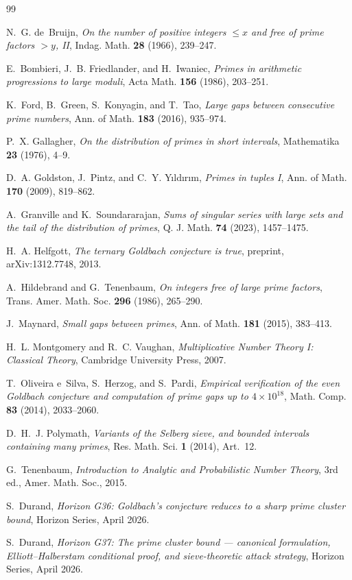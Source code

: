 \documentclass[11pt,reqno]{amsart}
\theoremstyle{plain}
\theoremstyle{definition}
\theoremstyle{remark}
\begin{document}
\begin{thebibliography}{99}

N.~G. de~Bruijn,
\emph{On the number of positive integers $\le x$ and free of prime
factors $> y$, II},
Indag. Math. \textbf{28} (1966), 239--247.

E.~Bombieri, J.~B. Friedlander, and H.~Iwaniec,
\emph{Primes in arithmetic progressions to large moduli},
Acta Math. \textbf{156} (1986), 203--251.

K.~Ford, B.~Green, S.~Konyagin, and T.~Tao,
\emph{Large gaps between consecutive prime numbers},
Ann. of Math. \textbf{183} (2016), 935--974.

P.~X. Gallagher,
\emph{On the distribution of primes in short intervals},
Mathematika \textbf{23} (1976), 4--9.

D.~A. Goldston, J.~Pintz, and C.~Y. Y{\i}ld{\i}r{\i}m,
\emph{Primes in tuples I},
Ann. of Math. \textbf{170} (2009), 819--862.

A.~Granville and K.~Soundararajan,
\emph{Sums of singular series with large sets and the tail of the
distribution of primes},
Q. J. Math. \textbf{74} (2023), 1457--1475.

H.~A. Helfgott,
\emph{The ternary Goldbach conjecture is true},
preprint, arXiv:1312.7748, 2013.

A.~Hildebrand and G.~Tenenbaum,
\emph{On integers free of large prime factors},
Trans. Amer. Math. Soc. \textbf{296} (1986), 265--290.

J.~Maynard,
\emph{Small gaps between primes},
Ann. of Math. \textbf{181} (2015), 383--413.

H.~L. Montgomery and R.~C. Vaughan,
\emph{Multiplicative Number Theory I: Classical Theory},
Cambridge University Press, 2007.

T.~Oliveira e~Silva, S.~Herzog, and S.~Pardi,
\emph{Empirical verification of the even Goldbach conjecture and
computation of prime gaps up to $4 \times 10^{18}$},
Math. Comp. \textbf{83} (2014), 2033--2060.

D.~H.~J. Polymath,
\emph{Variants of the Selberg sieve, and bounded intervals containing
many primes},
Res. Math. Sci. \textbf{1} (2014), Art.~12.

G.~Tenenbaum,
\emph{Introduction to Analytic and Probabilistic Number Theory},
3rd ed., Amer. Math. Soc., 2015.

S.~Durand,
\emph{Horizon G36: Goldbach's conjecture reduces to a sharp prime
cluster bound},
Horizon Series, April 2026.

S.~Durand,
\emph{Horizon G37: The prime cluster bound --- canonical formulation,
Elliott--Halberstam conditional proof, and sieve-theoretic attack
strategy},
Horizon Series, April 2026.

\end{thebibliography}
\end{document}

